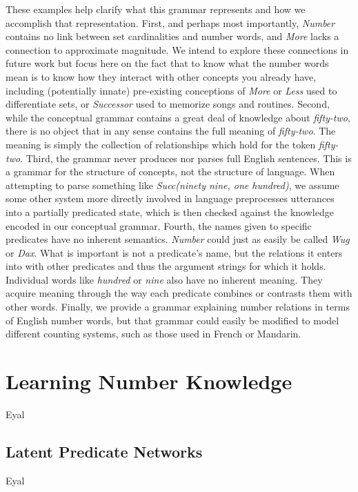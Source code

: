 \documentclass[10pt,letterpaper]{article}
\begin{document}
These examples help clarify what this grammar represents and how we
accomplish that representation. First, and perhaps most importantly,
\emph{Number} contains no link between set cardinalities and number
words, and \emph{More} lacks a connection to approximate magnitude. We
intend to explore these connections in future work but focus here on
the fact that to know what the number words mean is to know how they
interact with other concepts you already have, including (potentially
innate) pre-existing conceptions of \emph{More} or \emph{Less} used to
differentiate sets, or \emph{Successor} used to memorize songs and
routines. Second, while the conceptual grammar contains a great deal
of knowledge about \emph{fifty-two}, there is no object that in any
sense contains the full meaning of \emph{fifty-two}. The meaning is
simply the collection of relationships which hold for the token
\emph{fifty-two}. Third, the grammar never produces nor parses full
English sentences. This is a grammar for the structure of concepts,
not the structure of language. When attempting to parse something like
\emph{Succ(ninety nine, one hundred)}, we assume some other system
more directly involved in language preprocesses utterances into a
partially predicated state, which is then checked against the
knowledge encoded in our conceptual grammar. Fourth, the names given
to specific predicates have no inherent semantics. \emph{Number} could
just as easily be called \emph{Wug} or \emph{Dax}. What is important
is not a predicate's name, but the relations it enters into with other
predicates and thus the argument strings for which it holds.
Individual words like \emph{hundred} or \emph{nine} also have no
inherent meaning. They acquire meaning through the way each predicate
combines or contrasts them with other words. Finally, we provide a
grammar explaining number relations in terms of English number words,
but that grammar could easily be modified to model different counting
systems, such as those used in French or Mandarin.

\section{Learning Number Knowledge}

Eyal

\subsection{Latent Predicate Networks}

Eyal
\end{document}
